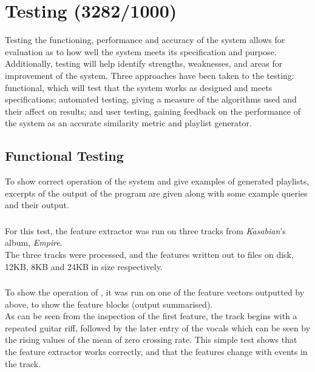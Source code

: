 \newcommand{\graph}[2]{
\begin{figure}[!hp]
	\caption{#2}
	\texttt{[image: testing/graphs/\#1]}
	\label{graph:#1}
\end{figure}}
\chapter{Testing (3282/1000)}
Testing the functioning, performance and accuracy of the system allows for evaluation as to how well the system meets its specification and purpose. Additionally, testing will help identify strengths, weaknesses, and areas for improvement of the system. Three approaches have been taken to the testing: functional, which will test that the system works as designed and meets specifications; automated testing, giving a measure of the algorithms used and their affect on results; and user testing, gaining feedback on the performance of the system as an accurate similarity metric and playlist generator.
\section{Functional Testing}
\label{text:testing:functional}
To show correct operation of the system and give examples of generated playlists, excerpts of the output of the program are given along with some example queries and their output.
\subsection{}
For this test, the feature extractor was run on three tracks from \emph{Kasabian}'s album, \emph{Empire}.\\

The three tracks were processed, and the features written out to files on disk, 12KB, 8KB and 24KB in size respectively.
\subsection{}
To show the operation of , it was run on one of the feature vectors outputted by  above, to show the feature blocks (output summarised).\\

As can be seen from the inspection of the first feature, the track begins with a repeated guitar riff, followed by the later entry of the vocals which can be seen by the rising values of the mean of zero crossing rate. This simple test shows that the feature extractor works correctly, and that the features change with events in the track.

